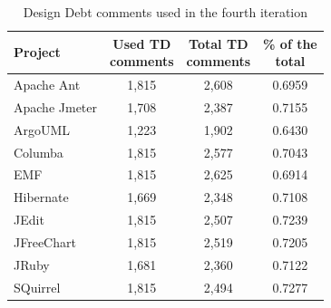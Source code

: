 \begin{table}[!hbt]
    \begin{center}
        \caption{Design Debt comments used in the fourth iteration}
        \label{tbl:design_comments_fourth_iteration}
        \begin{tabular}{l| c c c }
        \toprule
        \textbf{Project} & \thead{Used TD\\comments} & \thead{Total TD\\comments} & \thead{\% of the \\ total} \\
        \midrule
         Apache Ant    &  1,815 & 2,608 &  0.6959 \\  
         Apache Jmeter &  1,708 & 2,387 &  0.7155 \\  
         ArgoUML       &  1,223 & 1,902 &  0.6430 \\  
         Columba       &  1,815 & 2,577 &  0.7043 \\  
         EMF           &  1,815 & 2,625 &  0.6914 \\  
         Hibernate     &  1,669 & 2,348 &  0.7108 \\  
         JEdit         &  1,815 & 2,507 &  0.7239 \\  
         JFreeChart    &  1,815 & 2,519 &  0.7205 \\  
         JRuby         &  1,681 & 2,360 &  0.7122 \\  
         SQuirrel      &  1,815 & 2,494 &  0.7277 \\  
        \bottomrule
        \end{tabular}
    \end{center}    
\end{table}

